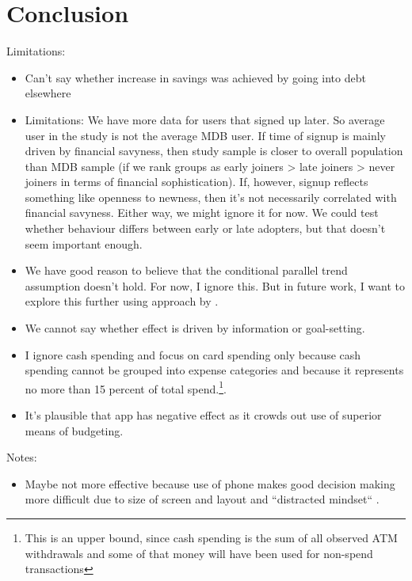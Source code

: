 
\section{Conclusion}
\label{sec:conclusion}

Limitations:
\begin{itemize}
    \item Can't say whether increase in savings was achieved by going into
        debt elsewhere

    \item Limitations: We have more data for users that signed up later. So average user in
        the study is not the average MDB user. If time of signup is mainly
        driven by financial savyness, then study sample is closer to overall
        population than MDB sample (if we rank groups as early joiners > late
        joiners > never joiners in terms of financial sophistication). If,
        however, signup reflects something like openness to newness, then it's
        not necessarily correlated with financial savyness. Either way, we
        might ignore it for now. We could test whether behaviour differs
        between early or late adopters, but that doesn't seem important enough.

    \item We have good reason to believe that the conditional parallel trend
        assumption doesn't hold. For now, I ignore this. But in future work, I
        want to explore this further using approach by
        \citet{rambachan2022more}.

    \item We cannot say whether effect is driven by information or
        goal-setting.

    \item I ignore cash spending and focus on card spending only because cash
        spending cannot be grouped into expense categories and because it
        represents no more than 15 percent of total spend.\footnote{This is an
            upper bound, since cash spending is the sum of all observed ATM
        withdrawals and some of that money will have been used for non-spend
    transactions}.

    \item It's plausible that app has negative effect as it crowds out
use of superior means of budgeting. 


\end{itemize}


Notes:
\begin{itemize}
    \item Maybe not more effective because use of phone makes good decision
        making more difficult due to size of screen and layout and ``distracted
        mindset`` \citet{levi2020mind}.
\end{itemize}
